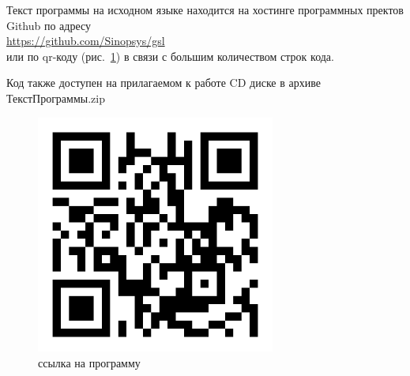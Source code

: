 Текст программы на исходном языке находится на хостинге программных пректов Github по
адресу\\
\url{https://github.com/Sinopsys/gsl}\\
или по qr-коду (рис.~\ref{qr}) в связи с большим количеством строк
кода.

Код также доступен на прилагаемом к работе CD диске в архиве ТекстПрограммы.zip

\begin{figure}[h!]
    \centering
    \includegraphics[width=0.7\textwidth]{./qr.png}
    \caption{ссылка на программу}
    \label{qr}
\end{figure}

